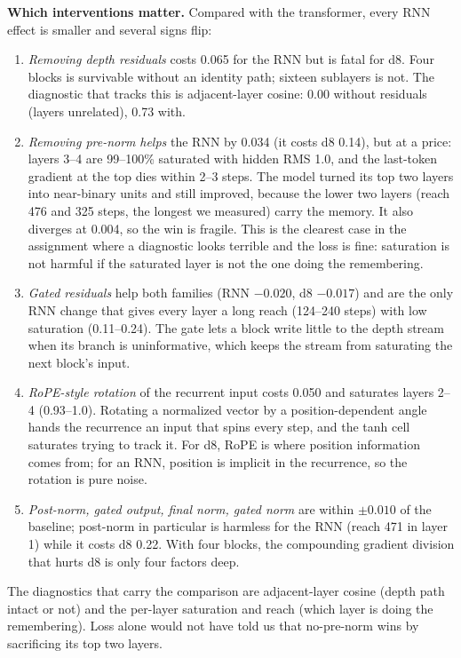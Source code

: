 \documentclass[10pt,letterpaper]{article}
\begin{document}
\textbf{Which interventions matter.} Compared with the transformer, every RNN effect is smaller and several signs flip:
\begin{enumerate}
\item \emph{Removing depth residuals} costs 0.065 for the RNN but is fatal for d8. Four blocks is survivable without an identity path; sixteen sublayers is not. The diagnostic that tracks this is adjacent-layer cosine: 0.00 without residuals (layers unrelated), 0.73 with.
\item \emph{Removing pre-norm} \emph{helps} the RNN by 0.034 (it costs d8 0.14), but at a price: layers 3--4 are 99--100\% saturated with hidden RMS 1.0, and the last-token gradient at the top dies within 2--3 steps. The model turned its top two layers into near-binary units and still improved, because the lower two layers (reach 476 and 325 steps, the longest we measured) carry the memory. It also diverges at 0.004, so the win is fragile. This is the clearest case in the assignment where a diagnostic looks terrible and the loss is fine: saturation is not harmful if the saturated layer is not the one doing the remembering.
\item \emph{Gated residuals} help both families (RNN $-0.020$, d8 $-0.017$) and are the only RNN change that gives every layer a long reach (124--240 steps) with low saturation (0.11--0.24). The gate lets a block write little to the depth stream when its branch is uninformative, which keeps the stream from saturating the next block's input.
\item \emph{RoPE-style rotation} of the recurrent input costs 0.050 and saturates layers 2--4 (0.93--1.0). Rotating a normalized vector by a position-dependent angle hands the recurrence an input that spins every step, and the tanh cell saturates trying to track it. For d8, RoPE is where position information comes from; for an RNN, position is implicit in the recurrence, so the rotation is pure noise.
\item \emph{Post-norm, gated output, final norm, gated norm} are within $\pm0.010$ of the baseline; post-norm in particular is harmless for the RNN (reach 471 in layer 1) while it costs d8 0.22. With four blocks, the compounding gradient division that hurts d8 is only four factors deep.
\end{enumerate}
The diagnostics that carry the comparison are adjacent-layer cosine (depth path intact or not) and the per-layer saturation and reach (which layer is doing the remembering). Loss alone would not have told us that no-pre-norm wins by sacrificing its top two layers.
\end{document}
